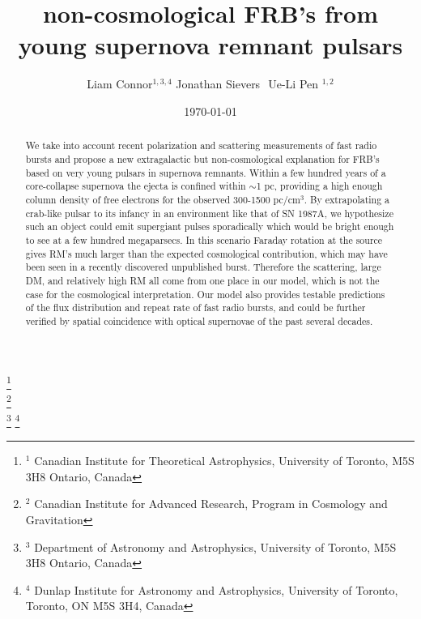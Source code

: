 \documentclass[useAMS,usenatbib]{emulateapj}
\begin{document}
\title{non-cosmological FRB's from young supernova remnant pulsars}
\author{
Liam Connor$^{1, 3, 4}$
Jonathan Sievers $^{}$
Ue-Li Pen $^{1, 2}$
}
\date{\today}

%
%

\begin{abstract}
We take into account recent polarization and scattering measurements of fast radio bursts
and propose a new extragalactic but non-cosmological explanation for FRB's based on
very young pulsars in supernova remnants. Within a few hundred years of a 
core-collapse supernova the ejecta 
is confined within $\sim$1 pc, providing a high enough column density of free electrons 
for the observed 300-1500 pc/cm$^3$. By extrapolating a crab-like pulsar to 
its infancy in an environment like that of SN 1987A, 
we hypothesize such an object could emit supergiant pulses sporadically which 
would be bright enough to see at a few hundred megaparsecs. In this scenario Faraday
rotation at the source gives RM's much larger than the expected cosmological contribution,
which may have been seen in a recently discovered unpublished burst. Therefore the scattering,
large DM, and relatively high RM all come from one place in our model,
 which is not the case for the cosmological
interpretation. Our model also provides
testable predictions of the flux distribution and repeat rate of fast radio bursts, and could be further
verified by spatial coincidence with optical supernovae of the past several decades. 

\end{abstract}

\footnote{$^1$ Canadian Institute for Theoretical Astrophysics, University of Toronto, M5S 3H8 Ontario, Canada} \\
\footnote{$^2$ Canadian Institute for Advanced Research, Program in Cosmology
and Gravitation}\\
\footnote{$^3$ Department of Astronomy and Astrophysics, University of Toronto, 
M5S 3H8 Ontario, Canada}
\footnote{$^4$ Dunlap Institute for Astronomy and Astrophysics, University of Toronto,
Toronto, ON M5S 3H4, Canada}


\newcommand{\be}{\begin{eqnarray}}
\newcommand{\ee}{\end{eqnarray}}
\newcommand{\beq}{\begin{equation}}
\newcommand{\eeq}{\end{equation}}
\end{document}
